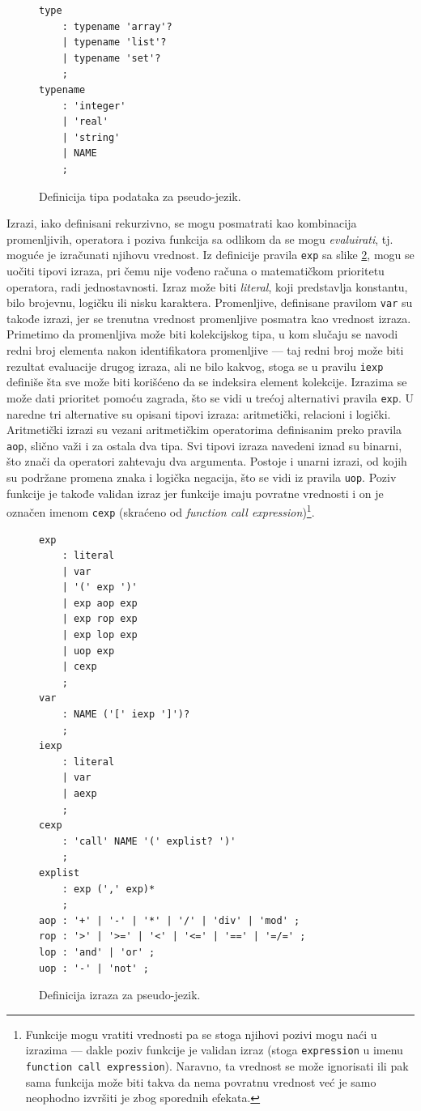 \begin{figure}[h!]
\begin{lstlisting}[language={}]
type 
    : typename 'array'?
    | typename 'list'?
    | typename 'set'?
    ;
typename 
    : 'integer' 
    | 'real' 
    | 'string' 
    | NAME 
    ;
\end{lstlisting}
\caption{Definicija tipa podataka za pseudo-jezik.}
\label{fig:PseudoDef5}
\end{figure}

Izrazi, iako definisani rekurzivno, se mogu posmatrati kao kombinacija promenljivih, operatora i poziva funkcija sa odlikom da se mogu \emph{evaluirati}, tj. moguće je izračunati njihovu vrednost. Iz definicije pravila \texttt{exp} sa slike \ref{fig:PseudoDef6}, mogu se uočiti tipovi izraza, pri čemu nije vođeno računa o matematičkom prioritetu operatora, radi jednostavnosti. Izraz može biti \emph{literal}, koji predstavlja konstantu, bilo brojevnu, logičku ili nisku karaktera. Promenljive, definisane pravilom \texttt{var} su takođe izrazi, jer se trenutna vrednost promenljive posmatra kao vrednost izraza. Primetimo da promenljiva može biti kolekcijskog tipa, u kom slučaju se navodi redni broj elementa nakon identifikatora promenljive --- taj redni broj može biti rezultat evaluacije drugog izraza, ali ne bilo kakvog, stoga se u pravilu \texttt{iexp} definiše šta sve može biti korišćeno da se indeksira element kolekcije. Izrazima se može dati prioritet pomoću zagrada, što se vidi u trećoj alternativi pravila \texttt{exp}. U naredne tri alternative su opisani tipovi izraza: aritmetički, relacioni i logički. Aritmetički izrazi su vezani aritmetičkim operatorima definisanim preko pravila \texttt{aop}, slično važi i za ostala dva tipa. Svi tipovi izraza navedeni iznad su binarni, što znači da operatori zahtevaju dva argumenta. Postoje i unarni izrazi, od kojih su podržane promena znaka i logička negacija, što se vidi iz pravila \texttt{uop}. Poziv funkcije je takođe validan izraz jer funkcije imaju povratne vrednosti i on je označen imenom \texttt{cexp} (skraćeno od \emph{function call expression})\footnote{Funkcije mogu vratiti vrednosti pa se stoga njihovi pozivi mogu naći u izrazima --- dakle poziv funkcije je validan izraz (stoga \texttt{expression} u imenu \texttt{function call expression}). Naravno, ta vrednost se može ignorisati ili pak sama funkcija može biti takva da nema povratnu vrednost već je samo neophodno izvršiti je zbog sporednih efekata.}.

\begin{figure}[h!]
\begin{lstlisting}[language={}]
exp
    : literal 
    | var
    | '(' exp ')'
    | exp aop exp
    | exp rop exp
    | exp lop exp
    | uop exp
    | cexp
    ;
var 
    : NAME ('[' iexp ']')?
    ;
iexp 
    : literal
    | var
    | aexp
    ;
cexp
    : 'call' NAME '(' explist? ')'
    ;
explist
    : exp (',' exp)*
    ;
aop : '+' | '-' | '*' | '/' | 'div' | 'mod' ;
rop : '>' | '>=' | '<' | '<=' | '==' | '=/=' ;
lop : 'and' | 'or' ;
uop : '-' | 'not' ;
\end{lstlisting}
\caption{Definicija izraza za pseudo-jezik.}
\label{fig:PseudoDef6}
\end{figure}

